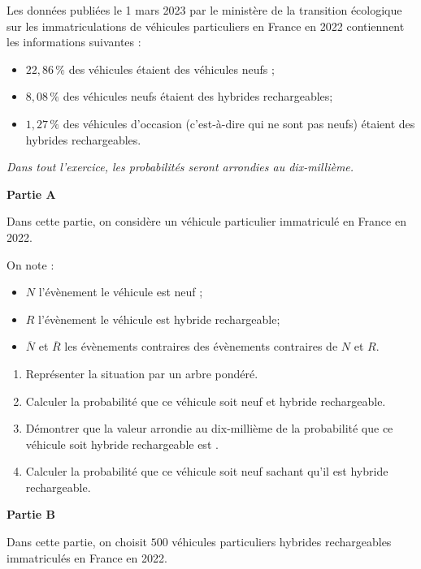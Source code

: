 Les données publiées le 1 mars 2023 par le ministère de la transition écologique sur les immatriculations de véhicules particuliers en France en 2022 contiennent les informations suivantes :

	\begin{itemize}
		\item $22,86\,\%$ des véhicules étaient des véhicules neufs ;
		\item $8,08\,\%$ des véhicules neufs étaient des hybrides rechargeables;
		\item $1,27\,\%$ des véhicules d'occasion (c'est-à-dire qui ne sont pas neufs) étaient des hybrides rechargeables.
	\end{itemize}

	\emph{Dans tout l'exercice, les probabilités seront arrondies au dix-millième.}
	
\medskip
	
	\textbf{Partie A}

Dans cette partie, on considère un véhicule particulier immatriculé en France en 2022.

On note :

\begin{itemize}
	\item $N$ l'évènement \og le véhicule est neuf \fg{};
	\item $R$ l'évènement \og le véhicule est hybride rechargeable\fg{};
	\item $\overline{N}$ et $\overline{R}$ les évènements contraires des évènements contraires de $N$ et $R$.
\end{itemize}

\begin{enumerate}
\item Représenter la situation par un arbre pondéré.

\item Calculer la probabilité que ce véhicule soit neuf et hybride rechargeable.

\item Démontrer que la valeur arrondie au dix-millième de la probabilité que ce véhicule soit hybride rechargeable est .

\item Calculer la probabilité que ce véhicule soit neuf sachant qu'il est hybride rechargeable.
\end{enumerate}

\textbf{Partie B}

\medskip

Dans cette partie, on choisit $500$ véhicules particuliers hybrides rechargeables immatriculés en France en 2022.

